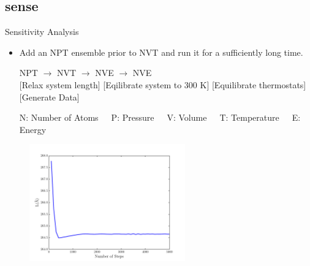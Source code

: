 \documentclass[xcolor={x11names,table},compress,svgnames,mathserif]{beamer}
\renewcommand{\(}{\begin{columns}}
\renewcommand{\)}{\end{columns}}
\newcommand{\<}[1]{\begin{column}{#1}}
\renewcommand{\>}{\end{column}}
\newcommand*\myitem{%
  \item[\color{DeepSkyBlue4}\scalebox{0.6}{\ding{110}}]}
\begin{document}
\subsection{sense}

\begin{frame}{Sensitivity Analysis}
\vspace{2mm}

\begin{itemize}

\myitem Add an NPT ensemble prior to NVT and run it for a sufficiently long time. 
\vspace{2mm}

\begin{center}
{\color{gray}NPT} \hspace{5mm} $\rightarrow$ \hspace{5mm} {\color{green}NVT} \hspace{5mm} $\rightarrow$ \hspace{5mm} 
{\color{cyan}NVE} \hspace{5mm}
$\rightarrow$ \hspace{5mm} {\color{magenta}NVE}
\\ \vspace{1mm}
\tiny [Relax system length] \hspace{1mm}[Eqilibrate system to 300 K] \hspace{1mm} [Equilibrate thermostats] \hspace{4mm}
 [Generate Data]
\\ \vspace{1mm}

\tiny{N: Number of Atoms~~~P: Pressure~~~V: Volume~~~T: Temperature~~~E: Energy}
\end{center}

\end{itemize}

\begin{center}
\vspace{-2mm}
\begin{figure}[htbp]
  \includegraphics[width=0.6\textwidth]{./Figures/lx_npt}
  \end{figure}
\end{center}

\end{frame}
\end{document}
